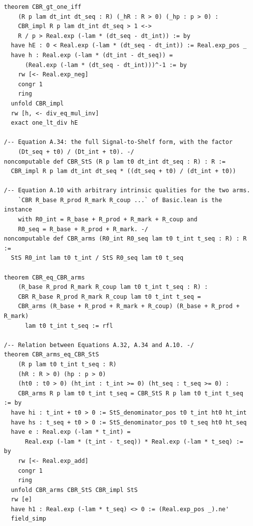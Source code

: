\documentclass[11pt,a4paper]{article}
\begin{document}
\begin{lstlisting}
theorem CBR_gt_one_iff
    (R p lam dt_int dt_seq : R) (_hR : R > 0) (_hp : p > 0) :
    CBR_impl R p lam dt_int dt_seq > 1 <->
    R / p > Real.exp (-lam * (dt_seq - dt_int)) := by
  have hE : 0 < Real.exp (-lam * (dt_seq - dt_int)) := Real.exp_pos _
  have h : Real.exp (-lam * (dt_int - dt_seq)) =
      (Real.exp (-lam * (dt_seq - dt_int)))^-1 := by
    rw [<- Real.exp_neg]
    congr 1
    ring
  unfold CBR_impl
  rw [h, <- div_eq_mul_inv]
  exact one_lt_div hE

/-- Equation A.34: the full Signal-to-Shelf form, with the factor
    (Dt_seq + t0) / (Dt_int + t0). -/
noncomputable def CBR_StS (R p lam t0 dt_int dt_seq : R) : R :=
  CBR_impl R p lam dt_int dt_seq * ((dt_seq + t0) / (dt_int + t0))

/-- Equation A.10 with arbitrary intrinsic qualities for the two arms.
    `CBR R_base R_prod R_mark R_coup ...` of Basic.lean is the instance
    with R0_int = R_base + R_prod + R_mark + R_coup and
    R0_seq = R_base + R_prod + R_mark. -/
noncomputable def CBR_arms (R0_int R0_seq lam t0 t_int t_seq : R) : R :=
  StS R0_int lam t0 t_int / StS R0_seq lam t0 t_seq

theorem CBR_eq_CBR_arms
    (R_base R_prod R_mark R_coup lam t0 t_int t_seq : R) :
    CBR R_base R_prod R_mark R_coup lam t0 t_int t_seq =
    CBR_arms (R_base + R_prod + R_mark + R_coup) (R_base + R_prod + R_mark)
      lam t0 t_int t_seq := rfl

/-- Relation between Equations A.32, A.34 and A.10. -/
theorem CBR_arms_eq_CBR_StS
    (R p lam t0 t_int t_seq : R)
    (hR : R > 0) (hp : p > 0)
    (ht0 : t0 > 0) (ht_int : t_int >= 0) (ht_seq : t_seq >= 0) :
    CBR_arms R p lam t0 t_int t_seq = CBR_StS R p lam t0 t_int t_seq := by
  have hi : t_int + t0 > 0 := StS_denominator_pos t0 t_int ht0 ht_int
  have hs : t_seq + t0 > 0 := StS_denominator_pos t0 t_seq ht0 ht_seq
  have e : Real.exp (-lam * t_int) =
      Real.exp (-lam * (t_int - t_seq)) * Real.exp (-lam * t_seq) := by
    rw [<- Real.exp_add]
    congr 1
    ring
  unfold CBR_arms CBR_StS CBR_impl StS
  rw [e]
  have h1 : Real.exp (-lam * t_seq) <> 0 := (Real.exp_pos _).ne'
  field_simp


\end{lstlisting}
\end{document}
